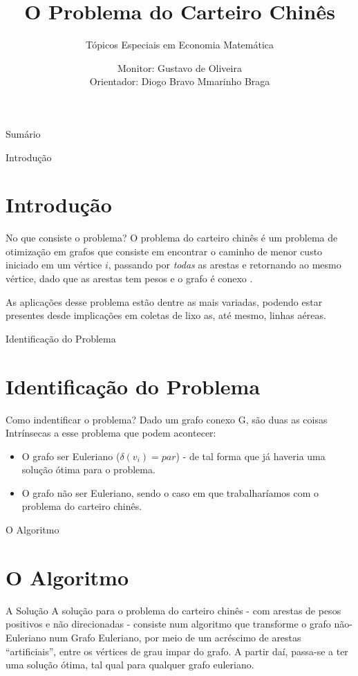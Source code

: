 \documentclass[xcolor=table]{beamer}
\title{O Problema do Carteiro Chinês}
\subtitle{Tópicos Especiais em Economia Matemática}
\author{Monitor: Gustavo de Oliveira\\ Orientador: Diogo Bravo Mmarinho Braga}
\institute{Universidade Federal Fluminense - Faculdade de Economia}
\date{}
\begin{document}
\begin{frame}{}
\titlepage
\end{frame}

\begin{frame}{Sumário}
\tableofcontents
\end{frame}

\begin{frame}{Introdução}
\section{Introdução}
\begin{block}{No que consiste o problema? }
O problema do carteiro chinês é um problema de otimização em grafos que consiste em encontrar o caminho de menor custo iniciado em um vértice $i$, passando por \textit{todas} as arestas e retornando ao mesmo vértice, dado que as arestas tem pesos e o grafo é conexo .  \\
\end{block}

As aplicações desse problema estão dentre as mais variadas, podendo estar presentes desde implicações em coletas de lixo as, até mesmo, linhas aéreas.

\end{frame}

\begin{frame}{Identificação do Problema}
\section{Identificação do Problema}
\begin{block}{Como indentificar o problema?}
Dado um grafo conexo G, são duas as coisas Intrínsecas a esse problema que podem acontecer:
    \begin{itemize}
        \item O grafo ser Euleriano ($\delta(v_{i}) = par$) - de tal forma que já haveria uma solução ótima para o problema.
        \item O grafo não ser Euleriano, sendo o caso em que trabalharíamos com o problema do carteiro chinês.
    \end{itemize}
\end{block}
\end{frame}

\begin{frame}{O Algoritmo }
\section{O Algoritmo}
\begin{block}{A Solução}
A solução para o problema do carteiro chinês - com arestas de pesos positivos e não direcionadas - consiste num algoritmo que transforme o grafo não-Euleriano num Grafo Euleriano, por meio de um acréscimo de arestas ``artificiais'', entre os vértices de grau impar do grafo. A partir daí, passa-se a ter uma solução ótima, tal qual para qualquer grafo euleriano. 
\end{block}     
\end{frame}
\end{document}

